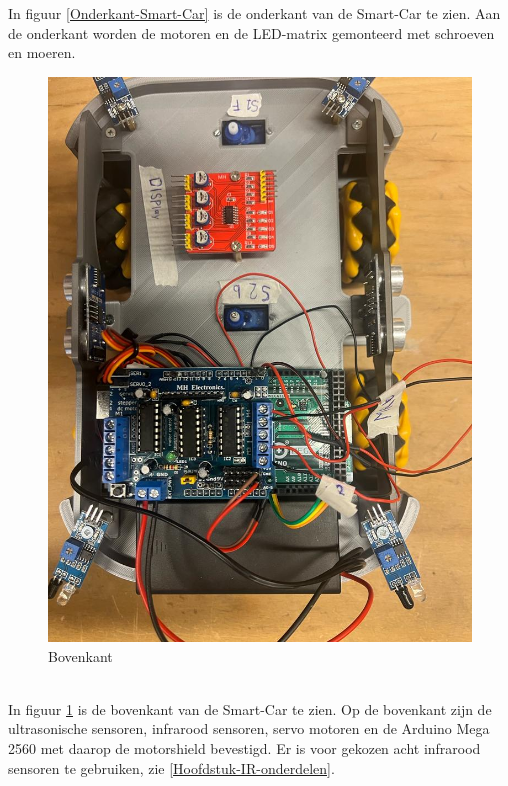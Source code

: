 In figuur \ref{Onderkant-Smart-Car} is de onderkant van de \gls{Smart-Car} te zien. Aan de onderkant worden de motoren en de LED-matrix gemonteerd met schroeven en moeren.
\\
\begin{figure}[h]
    \centering
    \includegraphics[scale = 0.20]{Media/Figuren/Assemblage/assembleren bovenkant.jpg}
    \caption{Bovenkant}
    \label{Bovenkant-Smart-Car}
\end{figure}
\\
In figuur \ref{Bovenkant-Smart-Car} is de bovenkant van de \gls{Smart-Car} te zien. Op de bovenkant zijn de ultrasonische sensoren,  infrarood sensoren, servo motoren en de Arduino Mega 2560 met daarop de motorshield bevestigd. Er is voor gekozen acht infrarood sensoren te gebruiken, zie \ref{Hoofdstuk-IR-onderdelen}. 
\\
